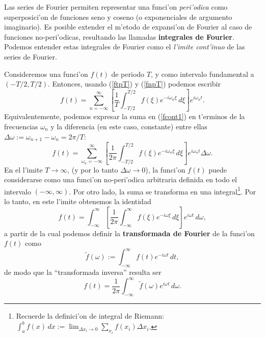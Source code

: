 Las series de Fourier permiten representar una funci'on \textit{peri'odica} como superposici'on de funciones seno y coseno (o exponenciales de argumento imaginario). Es posible extender el m'etodo de expansi'on de Fourier al caso de funciones no-peri'odicas, resultando las llamadas \textbf{integrales de Fourier}. Podemos entender estas integrales de Fourier como el \textit{l'imite cont'inuo} de las series de Fourier.

Consideremos una funci'on $f(t)$ de periodo $T$, y como intervalo fundamental a $(-T/2,T/2)$. Entonces, usando (\ref{ftpT}) y (\ref{fnpT}) podemos escribir
\begin{equation}\label{fcont1}
f(t) =\sum_{n = -\infty}^\infty\left[\frac{1}{T}\int_{-T/2}^{T/2} f(\xi) e^{-i\omega_n\xi}\, d\xi\right] e^{i\omega_nt}.
\end{equation}
Equivalentemente, podemos expresar la suma en (\ref{fcont1}) en t'erminos de la frecuencias $\omega_n$ y la diferencia (en este caso, constante) entre ellas $\Delta\omega:=\omega_{n+1}-\omega_n=2\pi/T$:
\begin{equation}
f(t) =\sum_{\omega_n = -\infty}^\infty\left[\frac{1}{2\pi}
\int_{-T/2}^{T/2} f(\xi) e^{-i\omega_n\xi}\,d\xi\right] e^{i\omega_n t}\Delta\omega.
\end{equation}
En el l'imite $T\to\infty$, (y por lo tanto $\Delta\omega\to 0$), la funci'on $f(t)$ puede considerarse como una funci'on no-peri'odica arbitraria definida en todo el intervalo $(-\infty,\infty)$. Por otro lado, la suma se transforma en una integral\footnote{Recuerde la definici'on de integral de Riemann: $\int_a^bf(x)\,dx:=\lim_{\Delta x_i\to 0}\sum_{x_i}f(x_i)\Delta x_i$.}. Por lo tanto, en este l'imite obtenemos la identidad
\begin{equation}\label{idfnp}
f(t) =\int_{-\infty}^\infty\left[\frac{1}{2\pi}\int_{-\infty}^\infty
 f(\xi) e^{-i\omega\xi}\,d\xi\right] e^{i\omega t}\,d\omega,
\end{equation}
a partir de la cual podemos definir la \textbf{transformada de Fourier} de la funci'on $f(t)$ como
\begin{equation}\label{TFf}
\boxed{\tilde{f}(\omega) :=\int_{-\infty}^\infty f(t) e^{-i\omega t}\,dt,}
\end{equation}
de modo que la ``transformada inversa'' resulta ser
\begin{equation}\label{TFIf}
\boxed{f(t)=\frac{1}{2\pi}\int_{-\infty}^\infty\tilde{f}(\omega) e^{i\omega t} \,d\omega.}
\end{equation}



